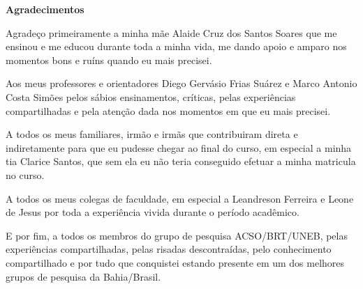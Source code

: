 
\begin{center}
 	{\large \textbf{Agradecimentos}}
\end{center}

Agradeço primeiramente a minha mãe Alaide Cruz dos Santos Soares que me ensinou e me educou 
durante toda a minha vida, me dando apoio e amparo nos momentos bons e ruíns quando eu mais 
precisei.  

Aos meus professores e orientadores Diego Gervásio Frias Suárez e Marco Antonio Costa Simões 
pelos sábios ensinamentos, críticas, pelas experi\^encias compartilhadas e pela atenção dada 
nos momentos em que eu mais precisei.

A todos os meus familiares, irmão e irmãs que contribuiram direta e indiretamente para que eu pudesse chegar ao final do curso, em especial a minha tia Clarice Santos, que sem ela eu não teria conseguido 
efetuar a minha matricula no curso.

A todos os meus colegas de faculdade, em especial a Leandreson Ferreira e Leone de Jesus por 
toda a experi\^encia vivida durante o período acad\^emico.

E por fim, a todos os membros do grupo de pesquisa ACSO/BRT/UNEB, pelas experi\^encias compartilhadas, pelas risadas descontraídas, pelo conhecimento compartilhado e por tudo que conquistei estando presente em um dos melhores grupos de pesquisa da Bahia/Brasil.